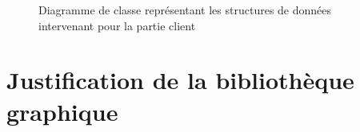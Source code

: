 \documentclass[a4paper]{article}
\begin{document}
\begin{figure}[H]
  \vspace*{-3cm}
   \caption{\label{3} Diagramme de classe représentant les structures de données intervenant pour la partie client}
\end{figure}

\section{Justification de la bibliothèque graphique}
\end{document}
